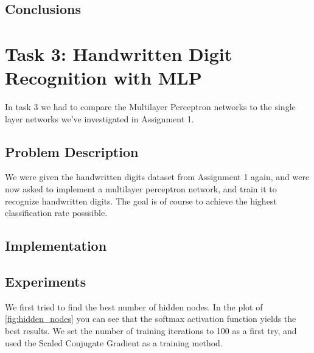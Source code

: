 \documentclass{article}
\begin{document}
\subsection{Conclusions}

\newpage
\section{Task 3: Handwritten Digit Recognition with MLP}
In task 3 we had to compare the Multilayer Perceptron networks to the single layer networks we've investigated in Assignment 1.

\subsection{Problem Description}
We were given the handwritten digits dataset from Assignment 1 again, and were now asked to implement a multilayer perceptron network, and train it to recognize handwritten digits.
The goal is of course to achieve the highest classification rate posssible.

\subsection{Implementation}


\subsection{Experiments}
We first tried to find the best number of hidden nodes. In the plot of \ref{fig:hidden_nodes} you can see that the softmax activation function yields the best results. We set the number of training iterations to 100 as a first try, and used the Scaled Conjugate Gradient as a training method. 
\end{document}
